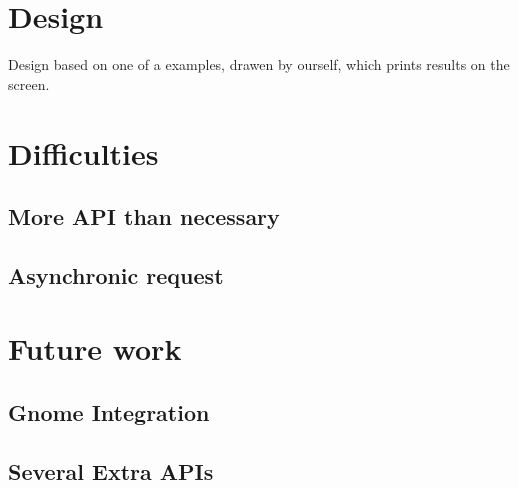 \documentclass[12pt]{article}
\numberwithin{equation}{section} %
\numberwithin{figure}{section} %
\numberwithin{table}{section} %
\begin{document}
\section{Design}
	Design based on one of a examples, drawen by ourself, which prints results on the screen.

\section{Difficulties}
	
	\subsection{More API than necessary}
	\subsection{Asynchronic request}
\section{Future work}
	\subsection{Gnome Integration}
	\subsection{Several Extra APIs}
\end{document}
